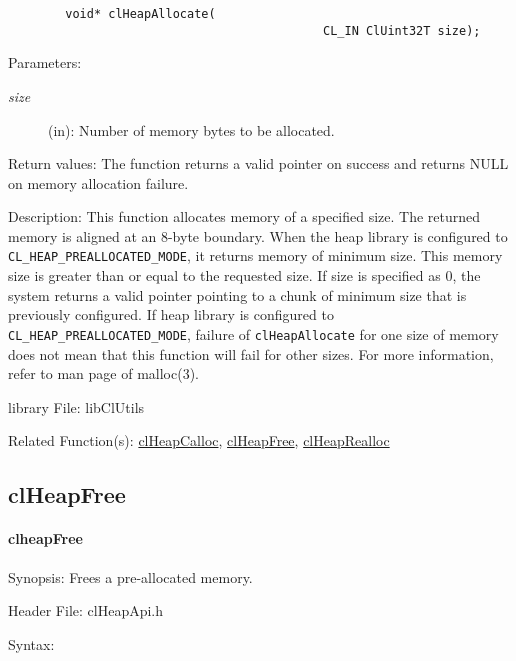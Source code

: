 \begin{flushleft}
\begin{Desc}
\footnotesize\begin{verbatim}        void* clHeapAllocate(
                                    		CL_IN ClUint32T size);
\end{verbatim}
\normalsize
\end{Desc}
\begin{Desc}
\item[Parameters:]
\begin{description}
\item[{\em size}](in): Number of memory bytes to be allocated.
\end{description}
\end{Desc}
\begin{Desc}
\item[Return values:]
 The function returns a valid pointer on success and returns NULL on memory allocation failure.
\end{Desc}
\begin{Desc}
\item[Description:]This function allocates memory of a specified size. The returned memory is aligned at an 8-byte boundary. 
When the heap library is configured to {\tt{CL\_\-HEAP\_\-PREALLOCATED\_\-MODE}}, it returns memory of minimum size. This memory size is 
greater than or equal to the requested size. If size is specified as 0, the system returns a valid pointer pointing to a chunk of minimum size
that is previously configured.
If heap library is configured to {\tt{CL\_\-HEAP\_\-PREALLOCATED\_\-MODE}}, failure
of {\tt{clHeapAllocate}} for one size of memory does not mean that
this function will fail for other sizes. For more information,
refer to man page of malloc(3). \end{Desc}
\begin{Desc}
\item[library File:]lib\-Cl\-Utils\end{Desc}
\begin{Desc}
\item[Related Function(s):]\hyperlink{pageheap130}{clHeapCalloc}, \hyperlink{pageheap129}{clHeapFree}, \hyperlink{pageheap105}{clHeapRealloc} \end{Desc}
\newpage



\subsection{clHeapFree}
\hypertarget{pageheap129}{}\paragraph{cl\-heap\-Free}\label{pageheap129}
\begin{Desc}
\item[Synopsis:]Frees a pre-allocated memory.\end{Desc}
\begin{Desc}
\item[Header File:]clHeapApi.h\end{Desc}
\begin{Desc}
\item[Syntax:]


\end{Desc}
\end{flushleft}
